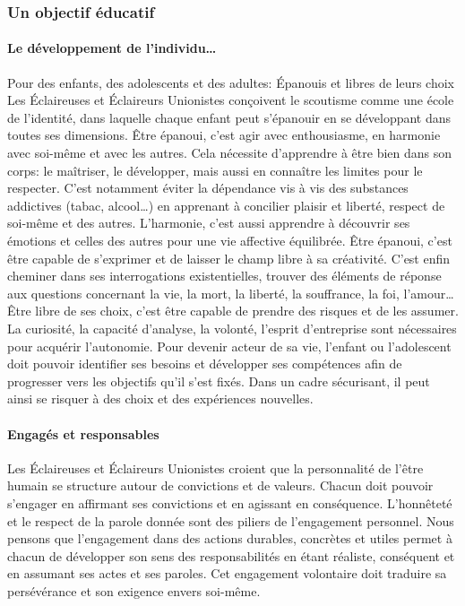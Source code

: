 \documentclass[titlepage,11pt,a4paper]{article}
\begin{document}
\subsubsection*{Un objectif éducatif}

\paragraph*{Le développement de l'individu…}
Pour des enfants, des adolescents et des adultes:
Épanouis et libres de leurs choix
Les Éclaireuses et Éclaireurs Unionistes conçoivent le scoutisme comme une école de l'identité, dans laquelle chaque enfant peut s'épanouir en se développant dans toutes ses dimensions. Être épanoui, c'est agir avec enthousiasme, en harmonie avec soi-même et avec les autres.
Cela nécessite d'apprendre à être bien dans son corps: le maîtriser, le développer, mais
aussi en connaître les limites pour le respecter. C'est notamment éviter la dépendance vis
à vis des substances addictives (tabac, alcool…) en apprenant à concilier plaisir et
liberté, respect de soi-même et des autres. L'harmonie, c'est aussi apprendre à découvrir ses émotions et celles des autres pour une vie affective équilibrée. Être épanoui, c'est être capable de s'exprimer et de laisser le champ libre à sa créativité. C'est enfin cheminer dans ses interrogations existentielles, trouver des éléments de réponse aux questions concernant la vie, la mort, la liberté, la souffrance, la foi, l'amour… Être libre de ses choix, c'est être capable de prendre des risques et de les assumer. La curiosité, la capacité d'analyse, la volonté, l'esprit d'entreprise sont nécessaires pour acquérir l'autonomie. Pour devenir acteur de sa vie, l'enfant ou l'adolescent doit pouvoir identifier ses besoins et développer ses compétences afin de progresser vers les objectifs qu'il s'est fixés. Dans un cadre sécurisant, il peut ainsi se risquer à des choix et des expériences nouvelles.

\paragraph*{Engagés et responsables}

Les Éclaireuses et Éclaireurs Unionistes croient que la personnalité de l'être humain se structure autour de convictions et de valeurs. Chacun doit pouvoir s'engager en affirmant ses convictions et en agissant en conséquence. L'honnêteté et le respect de la parole donnée sont des piliers de l'engagement personnel. Nous pensons que l'engagement dans des actions durables, concrètes et utiles permet à chacun de développer son sens des responsabilités en étant réaliste, conséquent et en assumant ses actes et ses paroles. Cet engagement volontaire doit traduire sa persévérance et son exigence envers soi-même.
\end{document}
